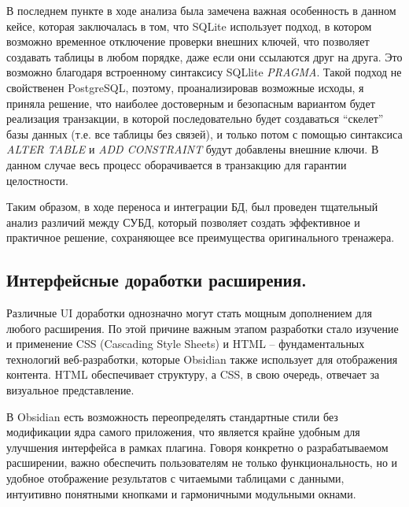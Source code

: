 \documentclass[14pt]{extarticle}
\begin{document}
	В последнем пункте в ходе анализа была замечена важная особенность в данном кейсе, которая заключалась в том, что SQLite использует подход, в котором возможно временное отключение проверки внешних ключей, что позволяет создавать таблицы в любом порядке, даже если они ссылаются друг на друга. Это возможно благодаря встроенному синтаксису SQLlite \textit{PRAGMA}. Такой подход не свойственен PostgreSQL, поэтому, проанализировав возможные исходы, я приняла решение, что наиболее достоверным и безопасным вариантом будет реализация транзакции, в которой последовательно будет создаваться “скелет” базы данных (т.е. все таблицы без связей), и только потом с помощью синтаксиса \textit{ALTER TABLE} и \textit{ADD CONSTRAINT} будут добавлены внешние ключи. В данном случае весь процесс оборачивается в транзакцию для гарантии целостности.
	\vspace{1em}
	
	Таким образом, в ходе переноса и интеграции БД, был проведен тщательный анализ различий между СУБД, который позволяет создать эффективное и практичное решение, сохраняющее все преимущества оригинального тренажера. 
	\newpage
	\subsection{Интерфейсные доработки расширения.}
	\vspace{1em}
	
	Различные UI доработки однозначно могут стать мощным дополнением
	для любого расширения. По этой причине важным этапом разработки стало
	изучение и применение CSS (Cascading Style Sheets) и HTML – фундаментальных технологий веб-разработки, которые Obsidian также использует для отображения контента. HTML обеспечивает структуру, а CSS, в свою очередь, отвечает за визуальное представление. 
	
	В Obsidian есть возможность переопределять стандартные стили без модификации ядра самого приложения, что является крайне удобным для улучшения интерфейса в рамках плагина. Говоря конкретно о разрабатываемом
	расширении, важно обеспечить пользователям не только функциональность,
	но и удобное отображение результатов с читаемыми таблицами с данными,
	интуитивно понятными кнопками и гармоничными модульными окнами.
	\vspace{1em}
	
\end{document}
